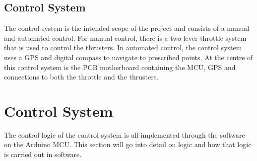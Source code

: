 \subsection{Control System}
The control system is the intended scope of the project and consists of a manual and automated control. For manual control, there is a two lever throttle system that is used to control the thrusters. In automated control, the control system uses a GPS and digital compass to navigate to prescribed points. At the centre of this control system is the PCB motherboard containing the MCU, GPS and connections to both the throttle and the thrusters. 
\section{Control System}
The control logic of the control system is all implemented through the software on the Arduino MCU. This section will go into detail on logic and how that logic is carried out in software. 
